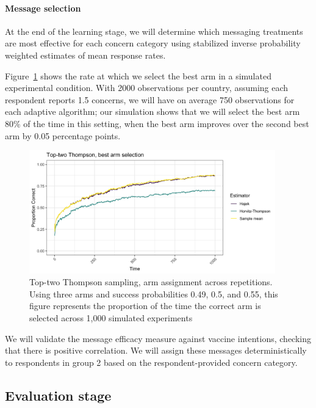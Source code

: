 \documentclass[letterpaper, 12pt, parskip=full,DIV=10]{scrartcl}
\begin{document}
\paragraph{Message selection}

At the end of the learning stage, we will determine which messaging treatments are most effective for each concern category using stabilized inverse probability weighted estimates of mean response rates. 

Figure~\ref{fig:ttt_best} shows the rate at which we select the best arm in a simulated experimental condition. With 2000 observations per country, assuming each respondent reports 1.5 concerns, we will have on average 750 observations for each adaptive algorithm; our simulation shows that we will select the best arm 80\% of the time in this setting, when the best arm improves over the second best arm by 0.05 percentage points.

\begin{figure}[htbp]
   \centering
   \includegraphics[width = 0.95\textwidth]{../../tables-figures/tt_correct.png}
   \caption{Top-two Thompson sampling, arm assignment across repetitions. Using three arms and success probabilities 0.49, 0.5, and 0.55, this figure represents the proportion of the time the correct arm is selected across 1,000 simulated experiments}
   \label{fig:ttt_best}
\end{figure}

We will validate the message efficacy measure against vaccine intentions, checking that there is positive correlation. We will assign these messages deterministically to respondents in group 2 based on the respondent-provided concern category. 

\subsection{Evaluation stage}
\end{document}
